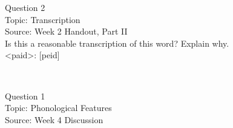 \documentclass[12pt]{article}
\begin{document}
{\large Question 2}\\

Topic: Transcription\\
Source: Week 2 Handout, Part II\\

Is this a reasonable transcription of this word? Explain why.\\

<paid>: {[peid]}


\newpage

\begin{center}
\textbf{{\color{red}{\HUGE END OF EXAM}}}\\

\end{center}
\newpage

\begin{center}
\textbf{{\color{blue}{\HUGE START OF EXAM\\}}}

\textbf{{\color{blue}{\HUGE Student ID: empty\\}}}

\textbf{{\color{blue}{\HUGE 9:20\\}}}

\end{center}
\newpage

\begin{center}
\textbf{{\color{blue}{\HUGE START OF EXAM\\}}}

\textbf{{\color{blue}{\HUGE Student ID: empty\\}}}

\textbf{{\color{blue}{\HUGE 9:30\\}}}

\end{center}
\newpage

\begin{center}
\textbf{{\color{blue}{\HUGE START OF EXAM\\}}}

\textbf{{\color{blue}{\HUGE Student ID: 83639\\}}}

\textbf{{\color{blue}{\HUGE 9:40\\}}}

\end{center}
\newpage

{\large Question 1}\\

Topic: Phonological Features\\
Source: Week 4 Discussion\\
\end{document}

